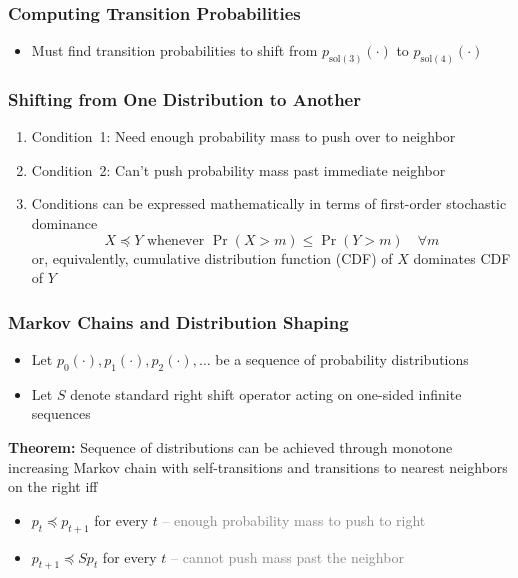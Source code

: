\documentclass[10pt]{beamer}
\begin{document}
\begin{frame}
\frametitle{Computing Transition Probabilities}
\begin{center}
\scalebox{0.9}{}
\end{center}
\begin{itemize}
\item Must find transition probabilities to shift from $p_{\mathrm{sol}(3)}(\cdot)$ to $p_{\mathrm{sol}(4)}(\cdot)$
\end{itemize}
\begin{center}
\scalebox{0.9}{}
\end{center}
\end{frame}


\begin{frame}
\frametitle{Shifting from One Distribution to Another}
\begin{center}
\scalebox{0.9}{}
\end{center}
\begin{enumerate}
\item Condition~1: Need enough probability mass to push over to neighbor
\item Condition~2: Can't push probability mass past immediate neighbor
\item Conditions can be expressed mathematically in terms of first-order stochastic dominance
\begin{equation*}
X \preceq Y \text{ whenever }
\Pr (X > m) \leq \Pr (Y > m) \quad \forall m
\end{equation*}
or, equivalently, cumulative distribution function (CDF) of $X$ dominates CDF of $Y$
\end{enumerate}
\end{frame}


\begin{frame}
\frametitle{Markov Chains and Distribution Shaping}
\begin{itemize}
\item Let $p_0(\cdot), p_1(\cdot), p_2(\cdot), \ldots$ be a sequence of probability distributions
\item Let $S$ denote standard right shift operator acting on one-sided infinite sequences
\end{itemize}
\begin{center}
 \scalebox{0.9}{}
\end{center}
\textbf{Theorem:}
Sequence of distributions can be achieved through monotone increasing Markov chain with self-transitions and transitions to nearest neighbors on the right iff
\begin{itemize}
\item $p_t \preceq p_{t+1}$ for every $t$ \textcolor{gray}{-- enough probability mass to push to right}
\item $p_{t+1} \preceq S p_t$ for every $t$ \textcolor{gray}{-- cannot push mass past the neighbor}
\end{itemize}
\end{frame}
\end{document}
